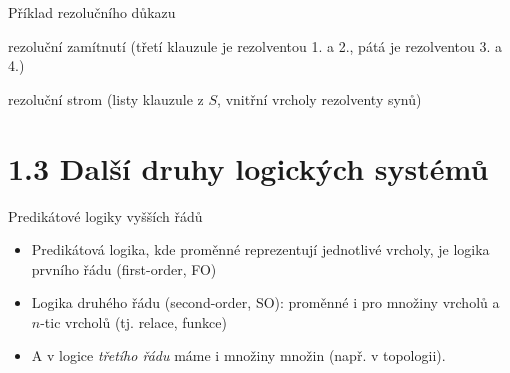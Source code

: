 \documentclass{beamer}
\begin{document}
\begin{frame}{Příklad rezolučního důkazu}

\alert{rezoluční zamítnutí} (třetí klauzule je rezolventou 1. a 2., pátá je rezolventou 3. a 4.)


\alert{rezoluční strom} (listy klauzule z $S$, vnitřní vrcholy rezolventy synů) 
\end{frame}



\section{1.3 Další druhy logických systémů}


\begin{frame}{Predikátové logiky vyšších řádů}

    \begin{itemize}
        \item Predikátová logika, kde proměnné reprezentují jednotlivé vrcholy, je logika \alert{prvního řádu} (\alert{first-order}, \alert{FO})
        \item Logika \alert{druhého řádu} (\alert{second-order}, \alert{SO}): proměnné i pro množiny vrcholů a $n$-tic vrcholů (tj. relace, funkce)
        \smallskip

        \item A v logice \emph{třetího řádu} máme i množiny množin (např. v topologii).
    \end{itemize}

\end{frame}
\end{document}
